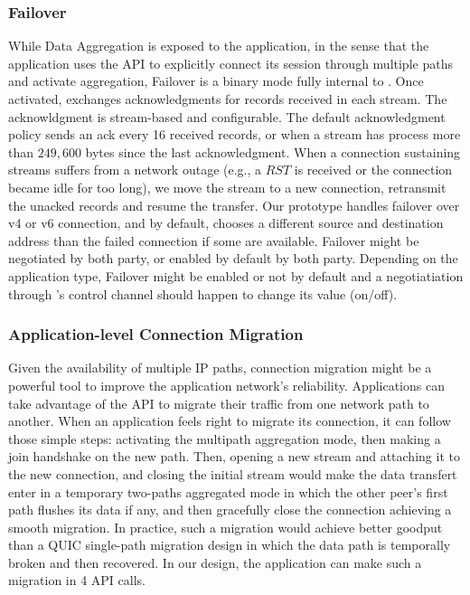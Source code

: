 \subsubsection{Failover}\label{failover}
While Data Aggregation is exposed to the application, in the sense that the
application uses the API to explicitly connect its session through multiple
paths and activate aggregation, Failover is a binary mode fully internal to
\tcpls. Once activated, \tcpls exchanges acknowledgments for records received in
each stream. The acknowldgment is stream-based and configurable. The default
acknowledgment policy sends an ack every 16 received records, or when a
stream has process more than $249,600$ bytes since the last acknowledgment.
When a \tcp connection sustaining \tcpls streams suffers from a network outage
(e.g., a $RST$ is received or the connection became idle for too long), we move
the stream to a new \tcp connection, retransmit the unacked records and resume
the transfer. Our prototype handles failover over v4 or v6 \tcp connection, and
by default, chooses a different source and destination address than the failed
\tcp connection if some are available. Failover might be negotiated by both
party, or enabled by default by both party. Depending on the application type,
Failover might be enabled or not by default and a negotiatiation through \tcpls's
control channel should happen to change its value (on/off).

\subsubsection{Application-level Connection Migration}
\label{sec:connmigr}

Given the availability of multiple IP paths, connection migration might be a
powerful tool to improve the application network's reliability. Applications
can take advantage of the \tcpls API to migrate their traffic from one network
path to another. When an application feels right to migrate its connection, it
can follow those simple steps: activating the multipath aggregation
mode, then making a \tcpls join handshake on the new path. Then, opening a new stream
and attaching it to the new \tcp connection, and closing the initial
stream would make the data transfert enter in a temporary two-paths aggregated mode in
which the other peer's first path flushes its data if any, and then gracefully close the \tcp
connection achieving a smooth migration. In practice, such a migration would
achieve better goodput than a QUIC single-path migration design in which the
data path is temporally broken and then recovered. In our design, the
application can make such a migration in 4 API calls.

